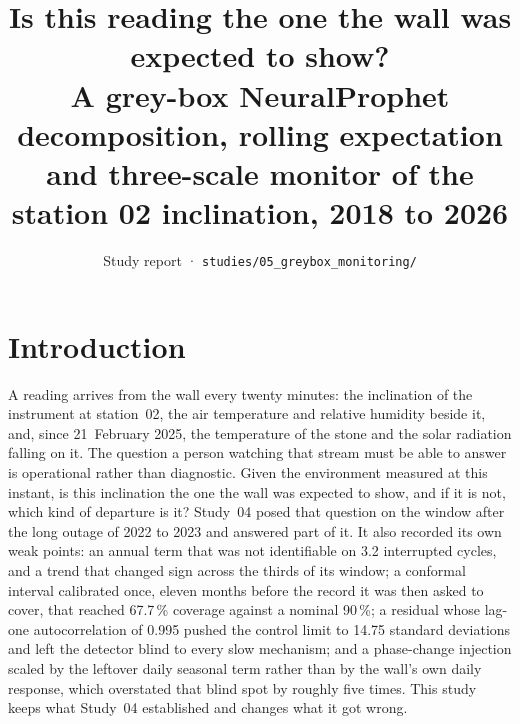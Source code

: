 \documentclass[11pt,a4paper]{article}
\title{\vspace{-1.2cm}\textbf{Is this reading the one the wall was expected to show?}\\[2mm]
\large A grey-box NeuralProphet decomposition, rolling expectation and
three-scale monitor of the station 02 inclination, 2018 to 2026}
\author{Study report · \texttt{studies/05\_greybox\_monitoring/}}
\date{}
\begin{document}
\maketitle
\thispagestyle{fancy}

\tableofcontents

\section{Introduction}
\label{sec:intro}

A reading arrives from the wall every twenty minutes: the inclination of the
instrument at station~02, the air temperature and relative humidity beside it,
and, since 21~February 2025, the temperature of the stone and the solar
radiation falling on it. The question a person watching that stream must be
able to answer is operational rather than diagnostic. Given the environment
measured at this instant, is this inclination the one the wall was expected to
show, and if it is not, which kind of departure is it? Study~04 posed that
question on the window after the long outage of 2022 to 2023 and answered part
of it. It also recorded its own weak points: an annual term that was not
identifiable on 3.2 interrupted cycles, and a trend that changed sign across
the thirds of its window; a conformal interval calibrated
once, eleven months before the record it was then asked to cover, that reached
67.7\,\% coverage against a nominal 90\,\%; a residual whose lag-one
autocorrelation of 0.995 pushed the control limit to 14.75 standard deviations
and left the detector blind to every slow mechanism; and a phase-change
injection scaled by the leftover daily seasonal term rather than by the wall's
own daily response, which overstated that blind spot by roughly five times.
This study keeps what Study~04 established and changes what it got wrong.
\end{document}
